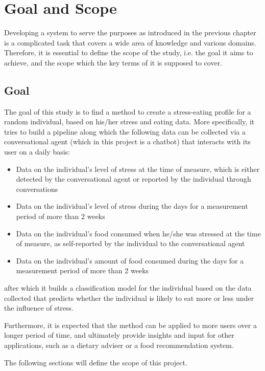 
\chapter{Goal and Scope}\label{chapter:goal_req}
Developing a system to serve the purposes as introduced in the previous chapter is a complicated task that covers a wide area of knowledge and various domains. Therefore, it is essential to define the scope of the study, i.e. the goal it aims to achieve, and the scope which the key terms of it is supposed to cover.

\section{Goal}
The goal of this study is to find a method to create a stress-eating profile for a random individual, based on his/her stress and eating data. More specifically, it tries to build a pipeline along which the following data can be collected via a conversational agent (which in this project is a chatbot) that interacts with its user on a daily basis:
\begin{itemize}
	\item Data on the individual’s level of stress at the time of measure, which is either detected by the conversational agent or reported by the individual through conversations
	\item Data on the individual’s level of stress during the days for a measurement period of more than 2 weeks
	\item Data on the individual’s food consumed when he/she was stressed at the time of measure, as self-reported by the individual to the conversational agent
	\item Data on the individual’s amount of food consumed during the days for a measurement period of more than 2 weeks
\end{itemize}
after which it builds a classification model for the individual based on the data collected that predicts whether the individual is likely to eat more or less under the influence of stress.

Furthermore, it is expected that the method can be applied to more users over a longer period of time, and ultimately provide insights and input for other applications, such as a dietary adviser or a food recommendation system.

The following sections will define the scope of this project.

